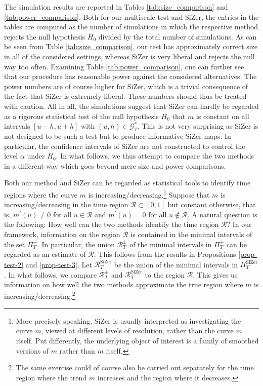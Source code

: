The simulation results are reported in Tables \ref{tab:size_comparison} and \ref{tab:power_comparison}. Both for our multiscale test and SiZer, the entries in the tables are computed as the number of simulations in which the respective method rejects the null hypothesis $H_0$ divided by the total number of simulations. As can be seen from Table \ref{tab:size_comparison}, our test has approximately correct size in all of the considered settings, whereas SiZer is very liberal and rejects the null way too often. Examining Table \ref{tab:power_comparison}, one can further see that our procedure has reasonable power against the considered alternatives. The power numbers are of course higher for SiZer, which is a trivial consequence of the fact that SiZer is extremely liberal. These numbers should thus be treated with caution. All in all, the simulations suggest that SiZer can hardly be regarded as a rigorous statistical test of the null hypothesis $H_0$ that $m$ is constant on all intervals $[u-h,u+h]$ with $(u,h) \in \mathcal{G}_T^*$. This is not very surprising as SiZer is not designed to be such a test but to produce informative SiZer maps. In particular, the confidence intervals of SiZer are not constructed to control the level $\alpha$ under $H_0$. In what follows, we thus attempt to compare the two methods in a different way which goes beyond mere size and power comparisons. 


Both our method and SiZer can be regarded as statistical tools to identify time regions where the curve $m$ is increasing/decreasing.\footnote{More precisely speaking, SiZer is usually interpreted as investigating the curve $m$, viewed at different levels of resolution, rather than the curve $m$ itself. Put differently, the underlying object of interest is a family of smoothed versions of $m$ rather than $m$ itself.} Suppose that $m$ is increasing/decreasing in the time region $\mathcal{R} \subset [0,1]$ but constant otherwise, that is, $m^\prime(u) \ne 0$ for all $u \in \mathcal{R}$ and $m^\prime(u) = 0$ for all $u \notin \mathcal{R}$. A natural question is the following: How well can the two methods identify the time region $\mathcal{R}$? In our framework, information on the region $\mathcal{R}$ is contained in the minimal intervals of the set $\Pi_T^\pm$. In particular, the union $\mathcal{R}_T^\pm$ of the minimal intervals in $\Pi_T^\pm$ can be regarded as an estimate of $\mathcal{R}$. This follows from the results in Propositions \ref{prop-test-2} and \ref{prop-test-3}. Let $\mathcal{R}_T^{\text{SiZer}}$ be the union of the minimal intervals in $\Pi_T^{\text{SiZer}}$. In what follows, we compare $\mathcal{R}_T^\pm$ and $\mathcal{R}_T^{\text{SiZer}}$ to the region $\mathcal{R}$. This gives us information on how well the two methods approximate the true region where $m$ is increasing/decreasing.\footnote{The same exercise could of course also be carried out separately for the time region where the trend $m$ increases and the region where it decreases.} 


